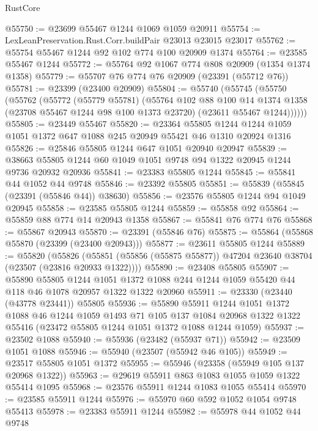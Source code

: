 \begin{lexlean}{RustCore}
\begin{coremodule}
@55750 := @23699 @55467 @1244 @1069 @1059 @20911
@55754 := LexLeanPreservation.Rust.Corr.buildPair @23013 @23015 @23017
@55762 := @55754 @55467 @1244 @92 @102 @774 @100 @20909 @1374
@55764 := @23585 @55467 @1244
@55772 := @55764 @92 @1067 @774 @808 @20909 (@1354 @1374 @1358)
@55779 := @55707 @76 @774 @76 @20909 (@23391 (@55712 @76))
@55781 := @23399 (@23400 @20909)
@55804 := @55740
    (@55745
      (@55750
        (@55762
          (@55772
            (@55779 @55781)
            (@55764
              @102
              @88
              @100
              @14
              @1374
              @1358
              (@23708 @55467 @1244 @98 @100 @1373 @23720)
              (@23611 @55467 @1244))))))
@55805 := @23449 @55467
@55820 := @23364
    @55805
    @1244
    @1244
    @1059
    @1051
    @1372
    @647
    @1088
    @245
    @20949
    @55421
    @46
    @1310
    @20924
    @1316
@55826 := @25846 @55805 @1244 @647 @1051 @20940 @20947
@55839 := @38663 @55805 @1244 @60 @1049 @1051 @9748 @94 @1322 @20945 @1244 @9736 @20932 @20936
@55841 := @23383 @55805 @1244
@55845 := @55841 @44 @1052 @44 @9748
@55846 := @23392 @55805
@55851 := @55839 (@55845 (@23391 (@55846 @44)) @38630)
@55856 := @23576 @55805 @1244 @94 @1049 @20945
@55858 := @23585 @55805 @1244
@55859 := @55858 @92
@55864 := @55859 @88 @774 @14 @20943 @1358
@55867 := @55841 @76 @774 @76
@55868 := @55867 @20943
@55870 := @23391 (@55846 @76)
@55875 := @55864 (@55868 @55870 (@23399 (@23400 @20943)))
@55877 := @23611 @55805 @1244
@55889 := @55820
    (@55826 (@55851 (@55856 (@55875 @55877)) @47204 @23640 @38704 (@23507 (@23816 @20933 @1322))))
@55890 := @23408 @55805
@55907 := @55890
    @55805
    @1244
    @1051
    @1372
    @1088
    @244
    @1244
    @1059
    @55420
    @44
    @118
    @46
    @1078
    @20957
    @1322
    @1322
    @20960
@55911 := @23330 (@23440 (@43778 @23441)) @55805
@55936 := @55890
    @55911
    @1244
    @1051
    @1372
    @1088
    @46
    @1244
    @1059
    @1493
    @71
    @105
    @137
    @1084
    @20968
    @1322
    @1322
    @55416
    (@23472 @55805 @1244 @1051 @1372 @1088 @1244 @1059)
@55937 := @23502 @1088
@55940 := @55936 (@23482 (@55937 @71))
@55942 := @23509 @1051 @1088
@55946 := @55940 (@23507 (@55942 @46 @105))
@55949 := @23517 @55805 @1051 @1372
@55955 := @55946 (@23358 (@55949 @105 @137 @20968 @1322))
@55963 := @29619 @55911 @863 @1083 @1055 @1059 @1322 @55414 @1095
@55968 := @23576 @55911 @1244 @1083 @1055 @55414
@55970 := @23585 @55911 @1244
@55976 := @55970 @60 @592 @1052 @1054 @9748 @55413
@55978 := @23383 @55911 @1244
@55982 := @55978 @44 @1052 @44 @9748

\end{coremodule}
\end{lexlean}
